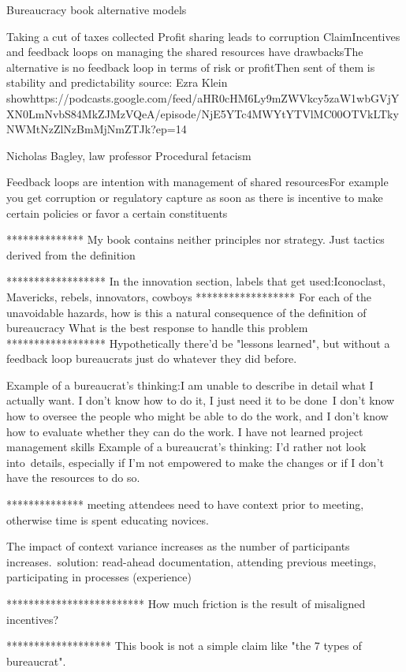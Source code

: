 Bureaucracy book alternative models

Taking a cut of taxes collected
Profit sharing leads to corruption
ClaimIncentives and feedback loops on managing the shared resources have drawbacksThe alternative is no feedback loop in terms of risk or profitThen sent of them is stability and predictability
source:
Ezra Klein showhttps://podcasts.google.com/feed/aHR0cHM6Ly9mZWVkcy5zaW1wbGVjYXN0LmNvbS84MkZJMzVQeA/episode/NjE5YTc4MWYtYTVlMC00OTVkLTkyNWMtNzZlNzBmMjNmZTJk?ep=14

Nicholas Bagley, law professor
Procedural fetacism

Feedback loops are intention with management of shared resourcesFor example you get corruption or regulatory capture as soon as there is incentive to make certain policies or favor a certain constituents

**************
My book contains neither principles nor strategy. Just tactics derived from the definition

******************
In the innovation section, labels that get used:Iconoclast, Mavericks, rebels, innovators, cowboys
******************
For each of the unavoidable hazards, how is this a natural consequence of the definition of bureaucracy
What is the best response to handle this problem
******************
Hypothetically there'd be "lessons learned", but without a feedback loop bureaucrats just do whatever they did before. 

Example of a bureaucrat's thinking:I am unable to describe in detail what I actually want. I don't know how to do it, I just need it to be done I don't know how to oversee the people who might be able to do the work, and I don't know how to evaluate whether they can do the work. I have not learned project management skills
Example of a bureaucrat's thinking:
I'd rather not look into details, especially if I'm not empowered to make the changes or if I don't have the resources to do so.

**************
meeting attendees need to have context prior to meeting, otherwise time is spent educating novices. 

The impact of context variance increases as the number of participants increases. solution: read-ahead documentation, attending previous meetings, participating in processes (experience)

*************************
How much friction is the result of misaligned incentives?

*******************
This book is not a simple claim like "the 7 types of bureaucrat". 

